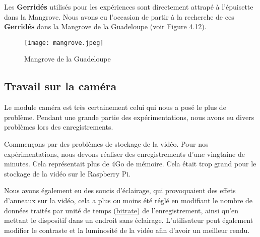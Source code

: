         Les \textbf{Gerridés} utilisés pour les expériences sont directement attrapé à l'épuisette dans la Mangrove. Nous avons eu l'occasion de partir à la recherche de ces \textbf{Gerridés} dans la Mangrove de la Guadeloupe (voir Figure 4.12).

        \begin{figure}[ht]
            \centering
            \texttt{[image: mangrove.jpeg]}
            \caption{Mangrove de la Guadeloupe}
        \end{figure}

        \vspace{3.5cm}
             
        \subsection{Travail sur la caméra}
        Le module caméra est très certainement celui qui nous a posé le plus de problème. Pendant une grande partie des expérimentations, nous avons eu divers problèmes lors des enregistrements.

        \vspace{0.2cm}

        Commençons par des problèmes de stockage de la vidéo. Pour nos expérimentations, nous devons réaliser des enregistrements d'une vingtaine de minutes.
        Cela représentait plus de 4Go de mémoire.
        Cela était trop grand pour le stockage de la vidéo sur le Raspberry Pi.

        \vspace{0.2cm}

        Nous avons également eu des soucis d'éclairage, qui provoquaient des effets d'anneaux sur la vidéo, cela a plus ou moins été réglé en modifiant le nombre de données traités par unité de temps (\underline{bitrate}) de l'enregistrement, ainsi qu'en mettant le dispositif dans un endroit sans éclairage.
        L'utilisateur peut également modifier le contraste et la luminosité de la vidéo afin d'avoir un meilleur rendu.

        \vspace{0.2cm}


